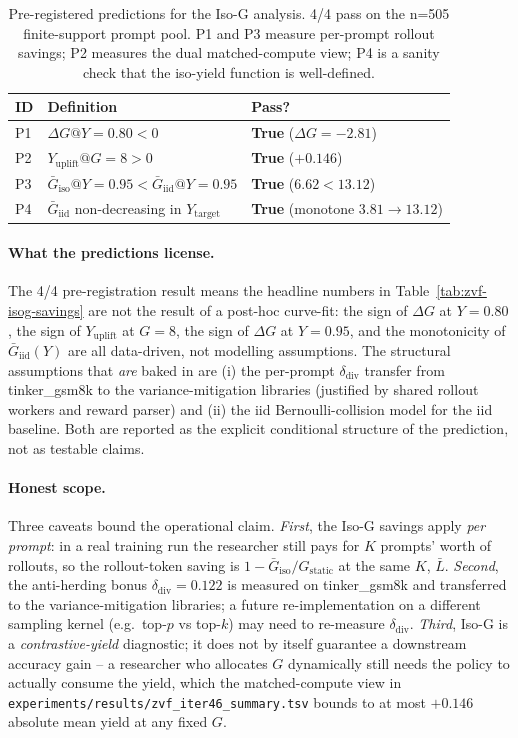 \documentclass{article}
\begin{document}
\begin{table}[htbp]
\centering\small
\setlength{\tabcolsep}{4pt}
\begin{tabular}{lll}
\hline
ID & Definition & Pass? \\
\hline
P1 & $\Delta G @ Y{=}0.80 < 0$ & \textbf{True} ($\Delta G = -2.81$) \\
P2 & $Y_{\mathrm{uplift}} @ G{=}8 > 0$ & \textbf{True} ($+0.146$) \\
P3 & $\bar G_{\mathrm{iso}} @ Y{=}0.95 < \bar G_{\mathrm{iid}} @ Y{=}0.95$
   & \textbf{True} ($6.62 < 13.12$) \\
P4 & $\bar G_{\mathrm{iid}}$ non-decreasing in $Y_{\mathrm{target}}$
   & \textbf{True} (monotone $3.81 \to 13.12$) \\
\hline
\end{tabular}
\caption{Pre-registered predictions for the Iso-G analysis. 4/4 pass
on the n=505 finite-support prompt pool. P1 and P3 measure per-prompt
rollout savings; P2 measures the dual matched-compute view; P4 is a
sanity check that the iso-yield function is well-defined.}
\label{tab:zvf-isog-preds}
\end{table}

\paragraph{What the predictions license.}
The 4/4 pre-registration result means the headline numbers in
Table~\ref{tab:zvf-isog-savings} are not the result of a
post-hoc curve-fit: the sign of $\Delta G$ at $Y{=}0.80$, the sign of
$Y_{\mathrm{uplift}}$ at $G{=}8$, the sign of $\Delta G$ at
$Y{=}0.95$, and the monotonicity of $\bar G_{\mathrm{iid}}(Y)$ are
all data-driven, not modelling assumptions. The structural assumptions
that \emph{are} baked in are (i) the per-prompt $\delta_{\mathrm{div}}$
transfer from tinker\_gsm8k to the variance-mitigation libraries
(justified by shared rollout workers and reward parser) and
(ii) the iid Bernoulli-collision model for the iid baseline. Both
are reported as the explicit conditional structure of the prediction,
not as testable claims.

\paragraph{Honest scope.}
Three caveats bound the operational claim. \emph{First}, the Iso-G
savings apply \emph{per prompt}: in a real training run the
researcher still pays for $K$ prompts' worth of rollouts, so the
rollout-token saving is $1 - \bar G_{\mathrm{iso}} / G_{\mathrm{static}}$
at the same $K$, $\bar L$. \emph{Second}, the anti-herding bonus
$\delta_{\mathrm{div}}{=}0.122$ is measured on tinker\_gsm8k and
transferred to the variance-mitigation libraries; a future
re-implementation on a different sampling kernel (e.g.\ top-$p$ vs
top-$k$) may need to re-measure $\delta_{\mathrm{div}}$. \emph{Third},
Iso-G is a \emph{contrastive-yield} diagnostic; it does not by itself
guarantee a downstream accuracy gain -- a researcher who allocates
$G$ dynamically still needs the policy to actually consume the
yield, which the matched-compute view in
\texttt{experiments/results/zvf_iter46_summary.tsv} bounds to at most
$+0.146$ absolute mean yield at any fixed $G$.
\end{document}
